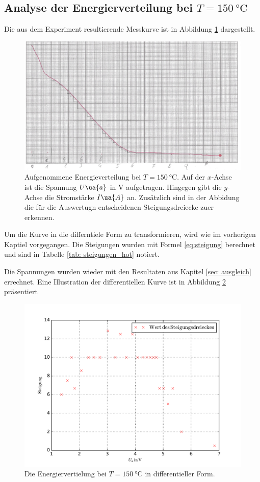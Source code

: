\subsection{Analyse der Energierverteilung bei $T=\SI{150}{\celsius}$}
\FloatBarrier
Die aus dem Experiment resultierende Messkurve ist in Abbildung \ref{fig: messkurve_energie_hot} dargestellt.
\begin{figure}
  \centering
  \includegraphics[width=0.8 \textwidth]{./pics/energieverteilung_hot.png}
  \caption{Aufgenommene Energieverteilung bei $T=\SI{150}{\celsius}$. Auf der $x$-Achse ist die Spannung $U\ua{a}$ in $\si{\volt}$ aufgetragen.
          Hingegen gibt die $y$-Achse die Stromstärke $I\ua{A}$ an. Zusätzlich sind in der Abbidung die für die Auswertugn entscheidenen Steigungsdreiecke zuer erkennen.}
  \label{fig: messkurve_energie_hot}
\end{figure}
Um die Kurve in die differntiele Form zu transformieren, wird wie im vorherigen Kaptiel vorgegangen.
Die Steigungen wurden mit Formel \eqref{eq:steigung} berechnet und sind in Tabelle \ref{tab: steigungen_hot} notiert.

Die Spannungen wurden wieder mit den Resultaten aus Kapitel \ref{sec: ausgleich} errechnet.
Eine Illustration der differentiellen Kurve ist in Abbildung \ref{fig: energie_hot_diff} präsentiert
\begin{figure}
  \centering
  \includegraphics[width=0.8 \textwidth]{../Messdaten/energie_hot.pdf}
  \caption{Die Energiervertielung bei $T=\SI{150}{\celsius}$ in differentieller Form.}
  \label{fig: energie_hot_diff}
\end{figure}
